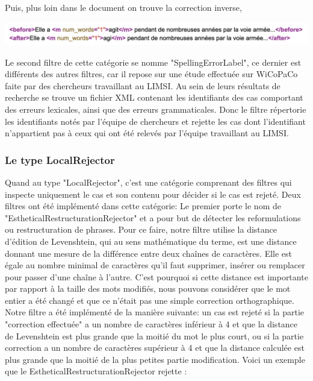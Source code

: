 \documentclass{article}
\begin{document}
Puis, plus loin dans le document on trouve la correction inverse,

\begin{center}
\includegraphics[width=14cm]{exemple11.png} %
\end{center}

Le second filtre de cette cat\'{e}gorie se nomme "SpellingErrorLabel", ce dernier est diff\'{e}rents des autres filtres, car il repose sur une \'{e}tude effectu\'{e}e sur WiCoPaCo faite par des chercheurs travaillant au LIMSI. Au sein de leurs r\'{e}sultats de recherche se trouve un fichier XML contenant les identifiants des cas comportant des erreurs lexicales, ainsi que des erreurs grammaticales. Donc le filtre r\'{e}pertorie les identifiants not\'{e}s par l'\'{e}quipe de chercheurs et rejette les cas dont l'identifiant n'appartient pas \`{a} ceux qui ont \'{e}t\'{e} relev\'{e}s par l'\'{e}quipe travaillant au LIMSI.

\subsubsection{Le type LocalRejector}
Quand au type "LocalRejector", c'est une cat\'{e}gorie comprenant des filtres qui inspecte uniquement le cas et son contenu pour d\'{e}cider si le cas est rejet\'{e}. 
	Deux filtres ont \'{e}t\'{e} impl\'{e}ment\'{e} dans cette cat\'{e}gorie:
Le premier porte le nom de "EstheticalRestructurationRejector" et a pour but de d\'{e}tecter les reformulations ou restructuration de phrases. Pour ce faire, notre filtre utilise la distance d'\'{e}dition de Levenshtein, qui au sens math\'{e}matique du terme, est une distance donnant une mesure de la diff\'{e}rence entre deux chaînes de caract\`{e}res. Elle est \'{e}gale au nombre minimal de caract\`{e}res qu'il faut supprimer, ins\'{e}rer ou remplacer pour passer d'une chaîne \`{a} l'autre. C'est pourquoi si cette distance est importante par rapport \`{a} la taille des mots modifi\'{e}s, nous pouvons consid\'{e}rer que le mot entier a \'{e}t\'{e} chang\'{e} et que ce n'\'{e}tait pas une simple correction orthographique. 
\newline
Notre filtre a \'{e}t\'{e} impl\'{e}ment\'{e} de la mani\`{e}re suivante: un cas est rejet\'{e} si la partie "correction effectu\'{e}e" a un nombre de caract\`{e}res inf\'{e}rieur \`{a} 4 et que la distance de Levenshtein est plus grande que la moiti\'{e} du mot le plus court, ou si la partie correction a un nombre de caract\`{e}res sup\'{e}rieur \`{a} 4 et que la distance calcul\'{e}e est plus grande que la moiti\'{e} de la plus petites partie modification.
Voici un exemple que le EstheticalRestructurationRejector rejette :
\end{document}
